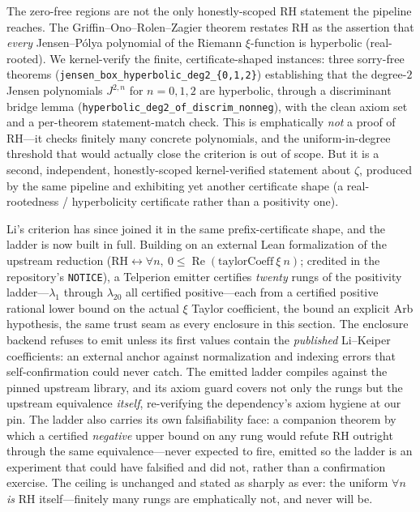The zero-free regions are not the only honestly-scoped RH statement the pipeline
reaches. The Griffin--Ono--Rolen--Zagier theorem \cite{gorz2019} restates RH as the
assertion that \emph{every} Jensen--P\'olya polynomial of the Riemann
$\xi$-function is hyperbolic (real-rooted). We kernel-verify the finite, certificate-shaped
instances: three sorry-free theorems (\texttt{jensen\_box\_hyperbolic\_deg2\_\{0,1,2\}})
establishing that the degree-$2$ Jensen polynomials $J^{2,n}$ for $n = 0, 1, 2$
are hyperbolic, through a discriminant bridge lemma
(\texttt{hyperbolic\_deg2\_of\_discrim\_nonneg}), with the clean axiom set and a
per-theorem statement-match check. This is emphatically \emph{not} a proof of
RH---it checks finitely many concrete polynomials, and the uniform-in-degree
threshold that would actually close the criterion is out of scope. But it is a
second, independent, honestly-scoped kernel-verified statement about $\zeta$,
produced by the same pipeline and exhibiting yet another certificate shape (a
real-rootedness / hyperbolicity certificate rather than a positivity one).

Li's criterion has since joined it in the same prefix-certificate shape, and
the ladder is now built in full. Building on an external Lean formalization of
the upstream reduction ($\mathrm{RH} \leftrightarrow \forall n,\ 0 \le
\operatorname{Re}(\text{taylorCoeff}\ \xi\ n)$; credited in the repository's
\texttt{NOTICE}), a Telperion emitter certifies \emph{twenty} rungs of the
positivity ladder---$\lambda_1$ through $\lambda_{20}$ all certified
positive---each from a certified positive rational lower bound on the actual
$\xi$ Taylor coefficient, the bound an explicit Arb hypothesis, the same trust
seam as every enclosure in this section. The enclosure backend refuses to emit
unless its first values contain the \emph{published} Li--Keiper coefficients:
an external anchor against normalization and indexing errors that
self-confirmation could never catch. The emitted ladder compiles against the
pinned upstream library, and its axiom guard covers not only the rungs but the
upstream equivalence \emph{itself}, re-verifying the dependency's axiom hygiene
at our pin. The ladder also carries its own falsifiability face: a companion
theorem by which a certified \emph{negative} upper bound on any rung would
refute RH outright through the same equivalence---never expected to fire,
emitted so the ladder is an experiment that could have falsified and did not,
rather than a confirmation exercise. The ceiling is unchanged and stated as
sharply as ever: the uniform $\forall n$ \emph{is} RH itself---finitely many
rungs are emphatically not, and never will be.

